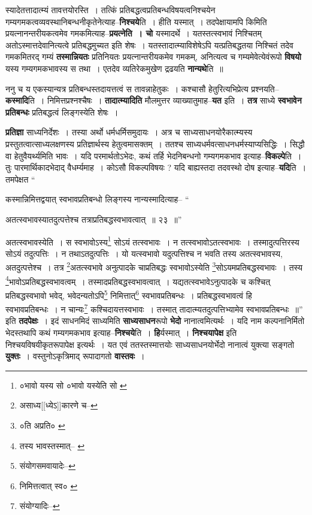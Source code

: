 \documentclass[article,12pt,a4paper]{memoir}
\begin{document}
	  \endgroup
	

	  \pstart स्यादेतत्तादात्म्यं तावत्तयोरस्ति । तत्किं प्रतिबद्धत्वप्रतिबन्धविषयत्वनिश्चयेन गम्यगमकत्वव्यवस्थानिबन्धनीकृतेनेत्याह--\textbf{निश्चये}ति । हीति यस्मात् । तदपेक्षायामपि किमिति प्रयत्नानन्तरीयकत्वमेव गमकमित्याह--\textbf{प्रयत्नेति । चो} यस्मादर्थे । यतस्तत्स्वभावं निश्चितम् अतोऽस्मात्तदेवानित्यत्वे प्रतिबद्धमुच्यत इति शेषः । यतस्तादात्म्याविशेषेऽपि यत्प्रतिबद्धतया निश्चितं तदेव गमकमितरद् गम्यं \textbf{तस्मान्नियतः} प्रतिनियतः प्रयत्नान्तरीयकमेव गमकम्, अनित्यत्व च गम्यमेवेत्येवंरूपो \textbf{विषयो} यस्य गम्यगमकभावस्य स तथा । एतदेव व्यतिरेकमुखेण द्रढयति \textbf{नान्यथे}ति ॥
	\pend
      

	  \pstart ननु च य एकस्यान्यत्र प्रतिबन्धस्तदायत्तत्वं स तावन्नाहेतुकः । कश्चासौ हेतुरित्यभिप्रेत्य प्रश्नयति--\textbf{कस्मादि}ति । निमित्तप्रश्नश्चैषः । \textbf{तादात्म्यादिति} मौलमुत्तर व्याख्यातुमाह--\textbf{यत} इति । \textbf{तत्र} साध्ये \textbf{स्वभावेन प्रतिबन्धः} प्रतिबद्धत्वं लिङ्गस्येति शेषः ।
	\pend
      

	  \pstart \textbf{प्रतिज्ञा} साध्यनिर्देशः । तस्या अर्थो धर्मधर्मिसमुदायः । अत्र च साध्यसाधनयोरैकात्म्यस्य प्रस्तुतत्वात्साध्यलक्षणस्य प्रतिज्ञार्थस्य हेतुत्वमासक्तम् । ततश्च साध्यधर्मवत्साधनधर्मस्याप्यसिद्धिः । सिद्धौ वा हेतुवैयर्थ्यमिति भावः । यदि परमार्थतोऽभेदः, कथं तर्हि भेदनिबन्धनो गम्यगमकभाव इत्याह--\textbf{विकल्पे}ति । तुः पारमार्थिकादभेदाद् वैधर्म्यमाह । कोऽसौ विकल्पविषयः ? यदि बाह्यस्तदा तदवस्थो दोष इत्याह--\textbf{यदि}ति । तमपेक्षत  \leavevmode{} “
	  
	कस्मान्निमित्तद्वयात् स्वभावप्रतिबन्धो लिङ्गस्य नान्यस्मादित्याह-- “
	  
	अतत्स्वभावस्यातदुत्पत्तेश्च तत्राप्रतिबद्धस्वभावत्वात् ॥ २३ ॥” 
	  
	अतत्स्वभावस्येति । स स्वभावोऽस्य\footnote{०भावो यस्य सो \cite{dp-msD} ०भावो यस्येति सो \cite{dp-msC}} सोऽयं तत्स्वभावः । न तत्स्वभावोऽतत्स्वभावः । तस्मादुत्पत्तिरस्य सोऽयं तदुत्पत्तिः । न तथाऽतदुत्पत्तिः । यो यत्स्वभावो यदुत्पत्तिश्च न भवति तस्य अतत्स्वभावस्य, अतदुत्पत्तेश्च । तत्र \footnote{असाध्य[[ध्येऽ]]कारणे च--\cite{dp-msD-n}}\-अतत्स्वभावे अनुत्पादके चाप्रतिबद्धः स्वभावोऽस्येति \footnote{०ति अप्रति० \cite{dp-msD}}\-सोऽयमप्रतिबद्धस्वभावः । तस्य \footnote{तस्य भावस्तस्मात्--\cite{dp-msD} \cite{dp-msC}}\-भावोऽप्रतिबद्धस्वभावत्वम् । तस्मादप्रतिबद्धस्वभावत्वात् । यद्यतत्स्वभावेऽनुत्पादके च कश्चित् प्रतिबद्धस्वभावो भवेद्, भवेदन्यतोऽपि\footnote{संयोगसमवायादेः--\cite{dp-msD-n}} निमित्तात्\footnote{निमित्तत्वात् स्व० \cite{dp-msC}} स्वभावप्रतिबन्धः । प्रतिबद्धस्वभावत्वं हि स्वभावप्रतिबन्धः । न चान्यः\footnote{संयोग्यादिः--\cite{dp-msD-n}} कश्चिदायत्तस्वभावः । तस्मात् तादात्म्यतदुत्पत्तिभ्यामेव स्वभावप्रतिबन्धः ॥” इति \textbf{तदपेक्षः} । इदं साधनमिदं साध्यमिति \textbf{साध्यसाधन}रूपो \textbf{भेदो} नानात्वमित्यर्थः । यदि नाम कल्पनानिर्मितो भेदस्तथापि कथं गम्यगमकभाव इत्याह--\textbf{निश्चये}ति । \textbf{हि}र्यस्मात् । \textbf{निश्चयापेक्ष} इति निश्चयविषयीकृतरूपापेक्ष इत्यर्थः । यत एवं ततस्तस्मात्तयोः साध्यसाधनयोर्भेदो नानात्वं युक्त्या सङ्गतो \textbf{युक्तः} । वस्तुनोऽकृत्रिमाद् रूपादागतो \textbf{वास्तवः} ।
	\pend
      
\end{document}
